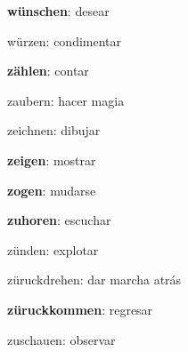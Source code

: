 \begin{multicols}{2}
\begin{myitemize}
\item \textbf{wünschen}: desear
\item würzen: condimentar
\item \textbf{zählen}: contar
\item zaubern: hacer magia
\item zeichnen: dibujar
\item \textbf{zeigen}: mostrar
\item \textbf{zogen}: mudarse
\item \textbf{zuhoren}: escuchar
\item zünden: explotar
\item züruckdrehen: dar marcha atrás
\item \textbf{züruckkommen}: regresar
\item zuschauen: observar
\end{myitemize}
\end{multicols}
